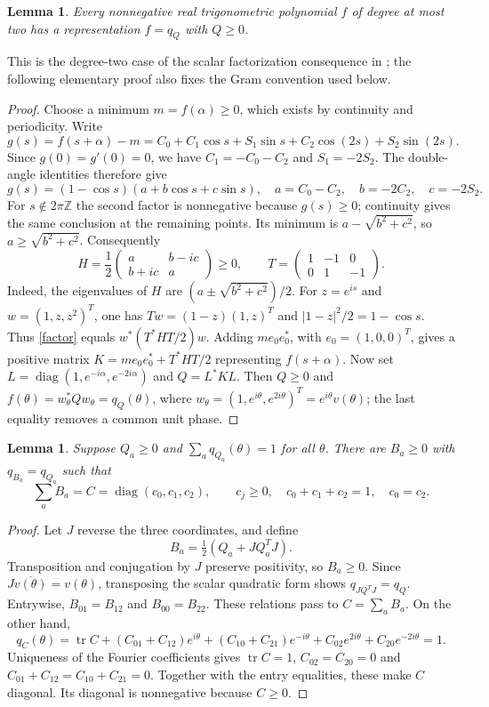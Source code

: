 \documentclass[11pt]{article}
\newtheorem{lemma}[theorem]{Lemma}
\newcommand{\tr}{\operatorname{tr}}
\newcommand{\diag}{\operatorname{diag}}
\begin{document}
\begin{lemma}\label{scalar}
Every nonnegative real trigonometric polynomial $f$ of degree at most two
has a representation $f=q_Q$ with $Q\geq0$.
\end{lemma}
This is the degree-two case of the scalar factorization consequence in
\cite[Lemma~9]{AGJLM}; the following elementary proof also fixes the Gram
convention used below.
\begin{proof}
Choose a minimum $m=f(\alpha)\geq0$, which exists by continuity and
periodicity. Write
\[
 g(s)=f(s+\alpha)-m=C_0+C_1\cos s+S_1\sin s
                       +C_2\cos(2s)+S_2\sin(2s).
\]
Since $g(0)=g'(0)=0$, we have $C_1=-C_0-C_2$ and $S_1=-2S_2$.
The double-angle identities therefore give
\begin{equation}\label{factor}
 g(s)=(1-\cos s)(a+b\cos s+c\sin s),\quad
 a=C_0-C_2,\quad b=-2C_2,\quad c=-2S_2.
\end{equation}
For $s\notin2\pi\mathbb Z$ the second factor is nonnegative because
$g(s)\geq0$; continuity gives the same conclusion at the remaining points.
Its minimum is $a-\sqrt{b^2+c^2}$, so $a\geq\sqrt{b^2+c^2}$.
Consequently
\[
 H=\frac12\begin{pmatrix}a&b-ic\\b+ic&a\end{pmatrix}\geq0,
 \qquad T=\begin{pmatrix}1&-1&0\\0&1&-1\end{pmatrix}.
\]
Indeed, the eigenvalues of $H$ are $(a\pm\sqrt{b^2+c^2})/2$.
For $z=e^{is}$ and $w=(1,z,z^2)^T$, one has
$Tw=(1-z)(1,z)^T$ and $|1-z|^2/2=1-\cos s$.
Thus \eqref{factor} equals $w^*(T^*HT/2)w$.
Adding $m e_0e_0^*$, with $e_0=(1,0,0)^T$, gives a positive matrix
$K=m e_0e_0^*+T^*HT/2$ representing $f(s+\alpha)$.
Now set $L=\diag(1,e^{-i\alpha},e^{-2i\alpha})$ and $Q=L^*KL$.
Then $Q\geq0$ and $f(\theta)=w_\theta^*Qw_\theta=q_Q(\theta)$,
where $w_\theta=(1,e^{i\theta},e^{2i\theta})^T
=e^{i\theta}v(\theta)$; the last equality removes a common unit phase.
\end{proof}

\begin{lemma}\label{normalization}
Suppose $Q_a\geq0$ and $\sum_a q_{Q_a}(\theta)=1$ for all $\theta$.
There are $B_a\geq0$ with $q_{B_a}=q_{Q_a}$ such that
\[
 \sum_a B_a=C=\diag(c_0,c_1,c_2),\qquad
 c_j\geq0,\quad c_0+c_1+c_2=1,\quad c_0=c_2.
\]
\end{lemma}
\begin{proof}
Let $J$ reverse the three coordinates, and define
\[
 B_a=\tfrac12(Q_a+JQ_a^TJ).
\]
Transposition and conjugation by $J$ preserve positivity, so $B_a\geq0$.
Since $J\overline{v(\theta)}=v(\theta)$, transposing the scalar quadratic
form shows $q_{JQ^TJ}=q_Q$. Entrywise, $B_{01}=B_{12}$ and
$B_{00}=B_{22}$. These relations pass to $C=\sum_a B_a$.
On the other hand,
\[
 q_C(\theta)=\tr C+(C_{01}+C_{12})e^{i\theta}
 +(C_{10}+C_{21})e^{-i\theta}
 +C_{02}e^{2i\theta}+C_{20}e^{-2i\theta}=1.
\]
Uniqueness of the Fourier coefficients gives $\tr C=1$,
$C_{02}=C_{20}=0$ and $C_{01}+C_{12}=C_{10}+C_{21}=0$.
Together with the entry equalities, these make $C$ diagonal.
Its diagonal is nonnegative because $C\geq0$.
\end{proof}
\end{document}
